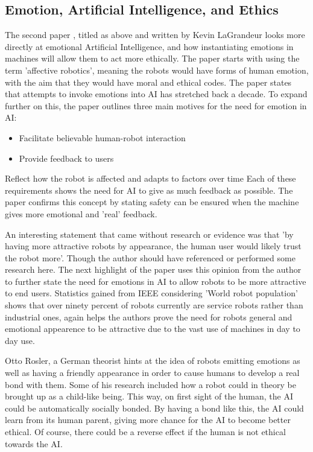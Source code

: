 \documentclass[article]{IEEEtran}
\begin{document}
\subsection{Emotion, Artificial Intelligence, and Ethics}
The second paper \cite{ethicsEmotion}, titled as above and written by Kevin LaGrandeur looks more directly at emotional Artificial Intelligence, and how instantiating emotions in machines will allow them to act more ethically. The paper starts with using the term 'affective robotics', meaning the robots would have forms of human emotion, with the aim that they would have moral and ethical codes. The paper states that attempts to invoke emotions into AI has stretched back a decade.
To expand further on this, the paper outlines three main motives for the need for emotion in AI:
\begin{itemize}
\item Facilitate believable human-robot interaction
\item Provide feedback to users
\end{itemize}
Reflect how the robot is affected and adapts to factors over time
Each of these requirements shows the need for AI to give as much feedback as possible. The paper confirms this concept by stating safety can be ensured when the machine gives more emotional and 'real' feedback. \par
An interesting statement that came without research or evidence was that 'by having more attractive robots by appearance, the human user would likely trust the robot more'. Though the author should have referenced or performed some research here. The next highlight of the paper uses this opinion from the author to further state the need for emotions in AI to allow robots to be more attractive to end users. Statistics gained from IEEE \cite{ieeRobotsStats} considering 'World robot population' shows that over ninety percent of robots currently are service robots rather than industrial ones, again helps the authors prove the need for robots general and emotional appearence to be attractive due to the vast use of machines in day to day use. \par
Otto Rosler, a German theorist hints at the idea of robots emitting emotions as well as having a friendly appearance in order to cause humans to develop a real bond with them. Some of his research included how a robot could in theory be brought up as a child-like being. This way, on first sight of the human, the AI could be automatically socially bonded. By having a bond like this, the AI could learn from its human parent, giving more chance for the AI to become better ethical. Of course, there could be a reverse effect if the human is not ethical towards the AI. \par
\end{document}
